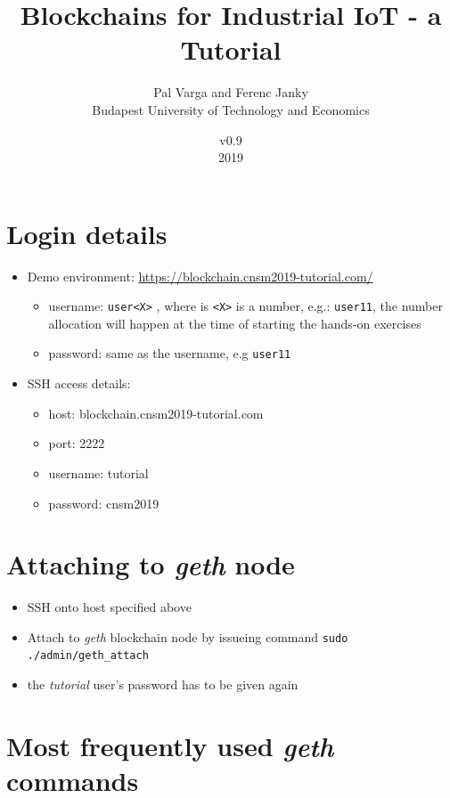 \documentclass[a4paper]{article}
\title{Blockchains for Industrial IoT - a Tutorial}
\author{Pal Varga and Ferenc Janky \\ Budapest University of Technology and Economics}
\date{v0.9 \\ 2019}
\begin{document}
\maketitle

\section{Login details}

\begin{itemize}
\item Demo environment: \url{https://blockchain.cnsm2019-tutorial.com/}
\begin{itemize}
\item username: \verb!user<X>! , where is \verb!<X>! is a number,  e.g.: \verb!user11!, the number allocation will happen at the time of starting the hands-on exercises
\item password: same as the username, e.g \verb!user11!
\end{itemize}
\item SSH access details:
\begin{itemize} 
\item host: blockchain.cnsm2019-tutorial.com
\item port: 2222
\item username: tutorial
\item password: cnsm2019
\end{itemize}
\end{itemize}

\section{Attaching to \emph{geth} node}

\begin{itemize}
\item SSH onto host specified above
\item Attach to \emph{geth} blockchain node by issueing command \verb!sudo ./admin/geth_attach!
\item the \emph{tutorial} user's password has to be given again
\end{itemize}

\section{Most frequently used \emph{geth} commands}
\end{document}
